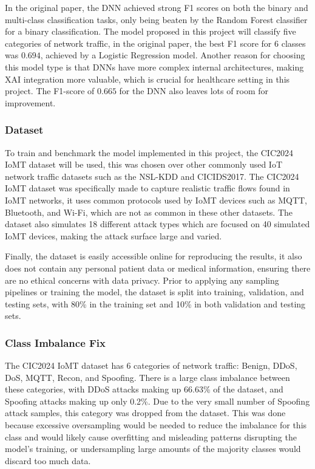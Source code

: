 \documentclass[11pt,a4paper]{article}
\begin{document}
In the original paper, the DNN achieved strong F1 scores on both the binary and multi-class classification tasks, only being beaten by the Random Forest classifier for a binary classification. The model proposed in this project will classify five categories of network traffic, in the original paper, the best F1 score for $6$ classes was $0.694$, achieved by a Logistic Regression model. Another reason for choosing this model type is that DNNs have more complex internal architectures, making XAI integration more valuable, which is crucial for healthcare setting in this project. The F1-score of $0.665$ for the DNN also leaves lots of room for improvement.

\subsubsection{Dataset}
To train and benchmark the model implemented in this project, the CIC2024 IoMT dataset will be used, this was chosen over other commonly used IoT network traffic datasets such as the NSL-KDD and CICIDS2017. The CIC2024 IoMT dataset was specifically made to capture realistic traffic flows found in IoMT networks, it uses common protocols used by IoMT devices such as MQTT, Bluetooth, and Wi-Fi, which are not as common in these other datasets. The dataset also simulates 18 different attack types which are focused on 40 simulated IoMT devices, making the attack surface large and varied.

Finally, the dataset is easily accessible online for reproducing the results, it also does not contain any personal patient data or medical information, ensuring there are no ethical concerns with data privacy. Prior to applying any sampling pipelines or training the model, the dataset is split into training, validation, and testing sets, with 80\% in the training set and 10\% in both validation and testing sets.

\subsubsection{Class Imbalance Fix}
The CIC2024 IoMT dataset has 6 categories of network traffic: Benign, DDoS, DoS, MQTT, Recon, and Spoofing. There is a large class imbalance between these categories, with DDoS attacks making up 66.63\% of the dataset, and Spoofing attacks making up only 0.2\%. Due to the very small number of Spoofing attack samples, this category was dropped from the dataset. This was done because excessive oversampling would be needed to reduce the imbalance for this class and would likely cause overfitting and misleading patterns disrupting the model’s training, or undersampling large amounts of the majority classes would discard too much data.
\end{document}
